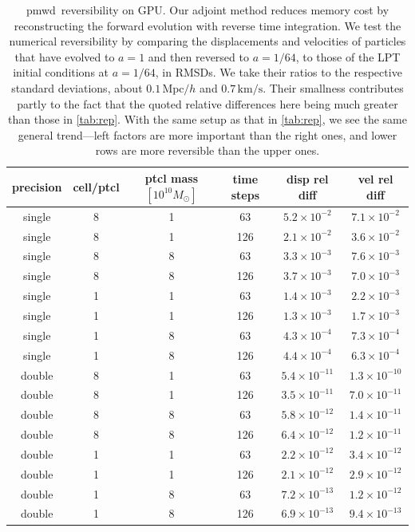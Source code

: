 \documentclass[modern, trackchanges, dvipsnames]{aastex631}
\newcommand{\pmwd}{{\usefont{T1}{nova}{m}{sl}pmwd}}
\newcommand{\Mpc}{\mathrm{Mpc}}
\begin{document}
\begin{table}[t]
\centering
\caption{\pmwd\ reversibility on GPU.
Our adjoint method reduces memory cost by reconstructing the forward
evolution with reverse time integration.
We test the numerical reversibility by comparing the displacements and
velocities of particles that have evolved to $a=1$ and then reversed to
$a=1/64$, to those of the LPT initial conditions at $a=1/64$, in RMSDs.
We take their ratios to the respective standard deviations, about $0.1
\, \Mpc / h$ and $0.7 \, \mathrm{km} / \mathrm{s}$.
Their smallness contributes partly to the fact that the quoted relative
differences here being much greater than those in \autoref{tab:rep}.
With the same setup as that in \autoref{tab:rep}, we see the same
general trend---left factors are more important than the right ones,
and lower rows are more reversible than the upper ones.
}
\label{tab:rev}
\begin{tabular}{cccccc}
  \toprule
  precision & cell/ptcl & ptcl mass $[10^{10} M_\odot]$ & time steps
    & disp rel diff & vel rel diff \\
  \midrule
  single & 8 & 1 &  63 & $5.2\times10^{-2}$  & $7.1\times10^{-2}$  \\
  single & 8 & 1 & 126 & $2.1\times10^{-2}$  & $3.6\times10^{-2}$  \\
  single & 8 & 8 &  63 & $3.3\times10^{-3}$  & $7.6\times10^{-3}$  \\
  single & 8 & 8 & 126 & $3.7\times10^{-3}$  & $7.0\times10^{-3}$  \\
  single & 1 & 1 &  63 & $1.4\times10^{-3}$  & $2.2\times10^{-3}$  \\
  single & 1 & 1 & 126 & $1.3\times10^{-3}$  & $1.7\times10^{-3}$  \\
  single & 1 & 8 &  63 & $4.3\times10^{-4}$  & $7.3\times10^{-4}$  \\
  single & 1 & 8 & 126 & $4.4\times10^{-4}$  & $6.3\times10^{-4}$  \\
  double & 8 & 1 &  63 & $5.4\times10^{-11}$ & $1.3\times10^{-10}$ \\
  double & 8 & 1 & 126 & $3.5\times10^{-11}$ & $7.0\times10^{-11}$ \\
  double & 8 & 8 &  63 & $5.8\times10^{-12}$ & $1.4\times10^{-11}$ \\
  double & 8 & 8 & 126 & $6.4\times10^{-12}$ & $1.2\times10^{-11}$ \\
  double & 1 & 1 &  63 & $2.2\times10^{-12}$ & $3.4\times10^{-12}$ \\
  double & 1 & 1 & 126 & $2.1\times10^{-12}$ & $2.9\times10^{-12}$ \\
  double & 1 & 8 &  63 & $7.2\times10^{-13}$ & $1.2\times10^{-12}$ \\
  double & 1 & 8 & 126 & $6.9\times10^{-13}$ & $9.4\times10^{-13}$ \\
  \bottomrule
\end{tabular}
\end{table}
\end{document}
